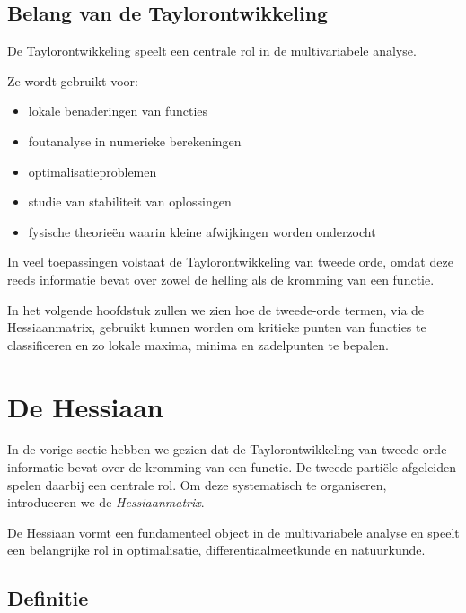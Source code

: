 \documentclass[11pt,a4paper]{article}
\begin{document}
    \subsection{Belang van de Taylorontwikkeling}

    De Taylorontwikkeling speelt een centrale rol in de multivariabele analyse.

    Ze wordt gebruikt voor:

    \begin{itemize}

        \item lokale benaderingen van functies

        \item foutanalyse in numerieke berekeningen

        \item optimalisatieproblemen

        \item studie van stabiliteit van oplossingen

        \item fysische theorieën waarin kleine afwijkingen worden onderzocht

    \end{itemize}

    In veel toepassingen volstaat de Taylorontwikkeling van tweede orde,
    omdat deze reeds informatie bevat over zowel de helling als de kromming
    van een functie.

    In het volgende hoofdstuk zullen we zien hoe de tweede-orde termen,
    via de Hessiaanmatrix, gebruikt kunnen worden om kritieke punten
    van functies te classificeren en zo lokale maxima, minima en
    zadelpunten te bepalen.


    \section{De Hessiaan}

    In de vorige sectie hebben we gezien dat de Taylorontwikkeling van tweede orde
    informatie bevat over de kromming van een functie. De tweede partiële afgeleiden
    spelen daarbij een centrale rol. Om deze systematisch te organiseren, introduceren
    we de \textit{Hessiaanmatrix}.

    De Hessiaan vormt een fundamenteel object in de multivariabele analyse en speelt
    een belangrijke rol in optimalisatie, differentiaalmeetkunde en natuurkunde.

    \subsection{Definitie}
\end{document}
